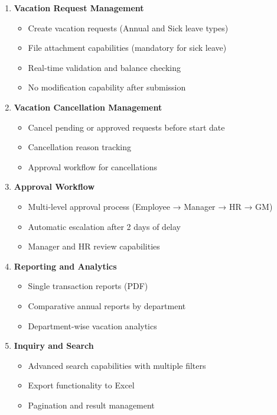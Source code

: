 \documentclass[12pt,a4paper]{article}
\begin{document}
\begin{enumerate}
    \item \textbf{Vacation Request Management}
    \begin{itemize}
        \item Create vacation requests (Annual and Sick leave types)
        \item File attachment capabilities (mandatory for sick leave)
        \item Real-time validation and balance checking
        \item No modification capability after submission
    \end{itemize}
    
    \item \textbf{Vacation Cancellation Management}
    \begin{itemize}
        \item Cancel pending or approved requests before start date
        \item Cancellation reason tracking
        \item Approval workflow for cancellations
    \end{itemize}
    
    \item \textbf{Approval Workflow}
    \begin{itemize}
        \item Multi-level approval process (Employee → Manager → HR → GM)
        \item Automatic escalation after 2 days of delay
        \item Manager and HR review capabilities
    \end{itemize}
    
    \item \textbf{Reporting and Analytics}
    \begin{itemize}
        \item Single transaction reports (PDF)
        \item Comparative annual reports by department
        \item Department-wise vacation analytics
    \end{itemize}
    
    \item \textbf{Inquiry and Search}
    \begin{itemize}
        \item Advanced search capabilities with multiple filters
        \item Export functionality to Excel
        \item Pagination and result management
    \end{itemize}
    

\end{enumerate}
\end{document}
